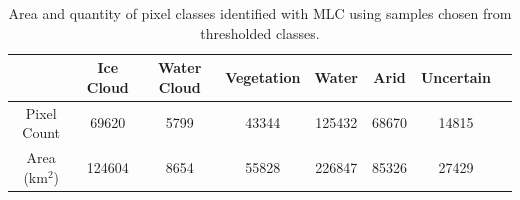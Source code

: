 \documentclass[12pt]{article}
\begin{document}
\begin{table}[h!]
    \centering
    \begin{tabular}{c|ccccccc}
    & Ice Cloud & Water Cloud & Vegetation & Water & Arid & Uncertain\\
    \hline
    Pixel Count & 69620 & 5799 & 43344 & 125432 & 68670 & 14815\\
    Area (km$^2$) & 124604 & 8654 & 55828 & 226847 & 85326 & 27429\\
    \end{tabular}
    \caption{Area and quantity of pixel classes identified with MLC using samples chosen from thresholded classes.}
    \label{mlc_thresh_areas}
\end{table}


\begin{table}[h!]
\centering
    \begin{center}
    \end{center}
    \caption{Confusion matrix comparing samples from manual thresholding to subsequent MLC results.}
\label{confusion_samples_thresh-mlc_thresh}
\end{table}

\clearpage
\end{document}
